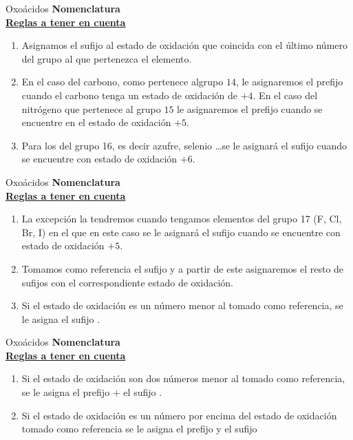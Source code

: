 \documentclass{beamer}
\newcommand*{\numberballmDarkTeal}{\protect\cnumero{\arabic*}{mDarkTeal}}
\newcommand{\alertbeamer}[1]{\alert{\textbf{#1}}}
\newcommand{\blockbeamer}[1]{{\color{mDarkTeal}\textbf{#1}}}
\newcommand{\nline}[1][6pt]{\\[#1]}
\begin{document}
\begin{frame}[t]{Oxoácidos}
    \alertbeamer{\Large Nomenclatura}\nline{}
    \blockbeamer{\uline{Reglas a tener en cuenta}}
    \begin{enumerate}[label=\numberballmDarkTeal]
        \item Asignamos el sufijo  al estado de oxidación que coincida con el último número del grupo al que pertenezca el elemento.
        \item En el caso del carbono, como pertenece algrupo $14$, le asignaremos el prefijo  cuando el carbono tenga un estado de oxidación de $+4$.
              En el caso del nitrógeno que pertenece al grupo $15$ le asignaremos el prefijo  cuando se encuentre en el estado de oxidación $+5$.
        \item Para los del grupo 16, es decir azufre, selenio \dots se le asignará el sufijo  cuando se encuentre con estado de oxidación $+6$.
    \end{enumerate}
\end{frame}

\begin{frame}[t]{Oxoácidos}
    \alertbeamer{\Large Nomenclatura}\nline{}
    \blockbeamer{\uline{Reglas a tener en cuenta}}
    \begin{enumerate}[label=\numberballmDarkTeal]
        \addtocounter{enumi}{3}
        \item La excepción la tendremos cuando tengamos elementos del grupo 17 (F, Cl, Br, I) en el que en este caso se le asignará el sufijo  cuando se encuentre con estado de oxidación $+5$.
        \item Tomamos como referencia el sufijo  y a partir de este asignaremos el resto de sufijos con el correspondiente estado de oxidación.
        \item Si el estado de oxidación es un número menor al tomado como referencia, se le asigna el sufijo .
    \end{enumerate}
\end{frame}

\begin{frame}[t]{Oxoácidos}
    \alertbeamer{\Large Nomenclatura}\nline{}
    \blockbeamer{\uline{Reglas a tener en cuenta}}
    \begin{enumerate}[label=\numberballmDarkTeal]
        \addtocounter{enumi}{6}
        \item Si el estado de oxidación son dos  números menor al tomado como referencia, se le asigna el prefijo  + el sufijo .
        \item Si el estado de oxidación es un número por encima del estado de oxidación tomado como referencia se le asigna el prefijo  y el sufijo 
    \end{enumerate}
\end{frame}
\end{document}
